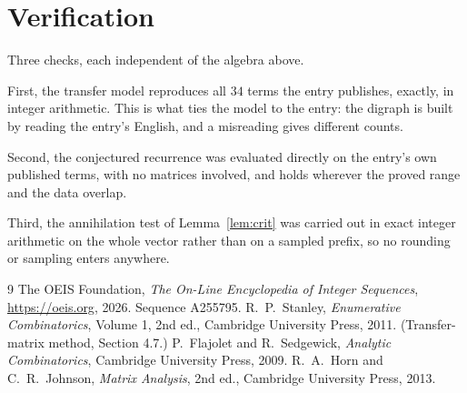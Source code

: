 \documentclass[11pt,a4paper]{article}
\theoremstyle{plain}
\theoremstyle{definition}
\begin{document}
\section{Verification}

Three checks, each independent of the algebra above.

First, the transfer model reproduces all $34$ terms the entry publishes, exactly, in
integer arithmetic. This is what ties the model to the entry: the digraph is built by reading
the entry's English, and a misreading gives different counts.

Second, the conjectured recurrence was evaluated directly on the entry's own published terms,
with no matrices involved, and holds wherever the proved range and the data overlap.

Third, the annihilation test of Lemma~\ref{lem:crit} was carried out in exact integer
arithmetic on the whole vector rather than on a sampled prefix, so no rounding or sampling
enters anywhere.

\begin{thebibliography}{9}
 The OEIS Foundation, \emph{The On-Line Encyclopedia of Integer
Sequences}, \url{https://oeis.org}, 2026. Sequence A255795.
 R.~P.~Stanley, \emph{Enumerative Combinatorics}, Volume 1, 2nd ed.,
Cambridge University Press, 2011. (Transfer-matrix method, Section 4.7.)
 P.~Flajolet and R.~Sedgewick, \emph{Analytic Combinatorics}, Cambridge
University Press, 2009.
 R.~A.~Horn and C.~R.~Johnson, \emph{Matrix Analysis}, 2nd ed., Cambridge
University Press, 2013.
\end{thebibliography}
\end{document}
